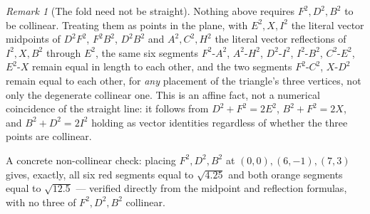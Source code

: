 \documentclass[12pt]{article}
\theoremstyle{remark}
\newtheorem{remark}[theorem]{Remark}
\begin{document}
\begin{remark}[The fold need not be straight]
Nothing above requires $F^2, D^2, B^2$ to be collinear. Treating them
as points in the plane, with $E^2, X, I^2$ the literal vector
midpoints of $D^2F^2$, $F^2B^2$, $D^2B^2$ and $A^2, C^2, H^2$ the
literal vector reflections of $I^2, X, B^2$ through $E^2$, the same
six segments $F^2$-$A^2$, $A^2$-$H^2$, $D^2$-$I^2$, $I^2$-$B^2$,
$C^2$-$E^2$, $E^2$-$X$ remain equal in length to each other, and the
two segments $F^2$-$C^2$, $X$-$D^2$ remain equal to each other, for
\emph{any} placement of the triangle's three vertices, not only the
degenerate collinear one. This is an affine fact, not a numerical
coincidence of the straight line: it follows from
$D^2 + F^2 = 2E^2$, $B^2 + F^2 = 2X$, and $B^2 + D^2 = 2I^2$ holding
as vector identities regardless of whether the three points are
collinear.
\end{remark}

\begin{center}
\end{center}

A concrete non-collinear check: placing $F^2, D^2, B^2$ at
$(0,0), (6,-1), (7,3)$ gives, exactly, all six red segments equal to
$\sqrt{4.25}$ and both orange segments equal to $\sqrt{12.5}$ ---
verified directly from the midpoint and reflection formulas, with no
three of $F^2, D^2, B^2$ collinear.
\end{document}
